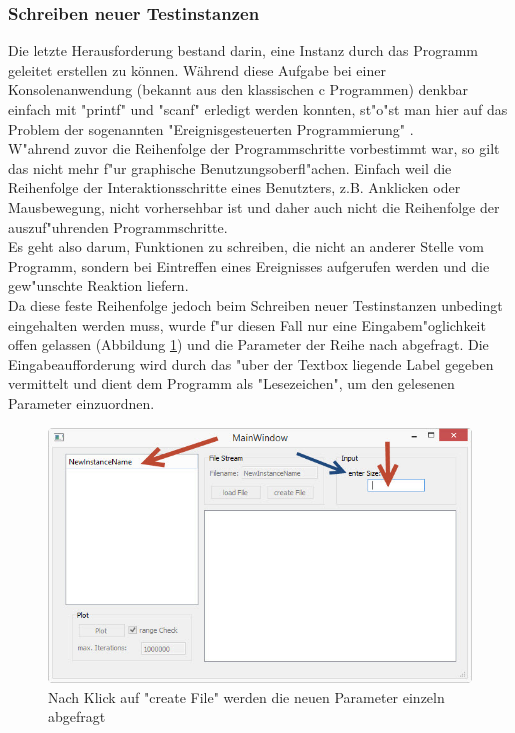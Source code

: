 \documentclass[11pt, a4paper, german]{article}
\theoremstyle{plain}
\begin{document}
	\subsubsection{Schreiben neuer Testinstanzen}
	Die letzte Herausforderung bestand darin, eine Instanz durch das Programm geleitet erstellen zu können. Während diese Aufgabe bei einer Konsolenanwendung (bekannt aus den klassischen c Programmen) denkbar einfach mit "{}printf"{} und "{}scanf"{} erledigt werden konnten, st"o"st man hier auf das Problem der sogenannten "{}Ereignisgesteuerten Programmierung"{} \cite{breymann2011c++}.\\
	W"ahrend zuvor die Reihenfolge der Programmschritte vorbestimmt war, so gilt das nicht mehr f"ur graphische Benutzungsoberfl"achen. Einfach weil die Reihenfolge der Interaktionsschritte eines Benutzters, z.B. Anklicken oder Mausbewegung, nicht vorhersehbar ist und daher auch nicht die Reihenfolge der auszuf"uhrenden Programmschritte.\\
	Es geht also darum, Funktionen zu schreiben, die nicht an anderer Stelle vom Programm, sondern bei Eintreffen eines Ereignisses aufgerufen werden und die gew"unschte Reaktion liefern.\\
	Da diese feste Reihenfolge jedoch beim Schreiben neuer Testinstanzen unbedingt eingehalten werden muss, wurde f"ur diesen Fall nur eine Eingabem"oglichkeit offen gelassen (Abbildung \ref{fig:MainWindow_createFile}) und die Parameter der Reihe nach abgefragt. Die Eingabeaufforderung wird durch das "uber der Textbox liegende Label gegeben vermittelt und dient dem Programm als "{}Lesezeichen"{}, um den gelesenen Parameter einzuordnen.\\
	\begin{figure}[H]
		\centering
		\includegraphics[width=1\linewidth]{./Pictures/MainWindow_createFile}
		\caption[erstelle Datei]{Nach Klick auf "{}create File"{} werden die neuen Parameter einzeln abgefragt}
		\label{fig:MainWindow_createFile}
	\end{figure}
	
\end{document}
